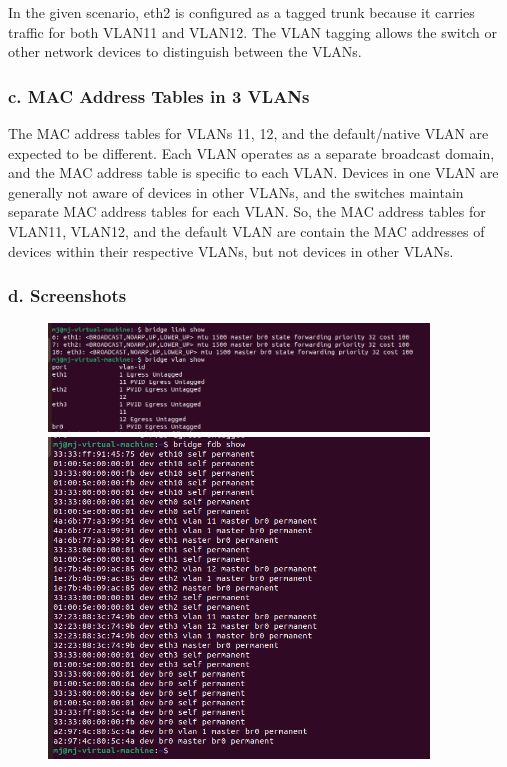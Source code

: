 \documentclass{report}
\begin{document}
In the given scenario, eth2 is configured as a tagged trunk because it carries traffic for both VLAN11 and VLAN12.
The VLAN tagging allows the switch or other network devices to distinguish between the VLANs.

\subsubsection*{c. MAC Address Tables in 3 VLANs}
The MAC address tables for VLANs 11, 12, and the default/native VLAN are expected to be different. 
Each VLAN operates as a separate broadcast domain, and the MAC address table is specific to each VLAN.
Devices in one VLAN are generally not aware of devices in other VLANs, and the switches maintain separate MAC address tables for each VLAN.
So, the MAC address tables for VLAN11, VLAN12, and the default VLAN are contain the MAC addresses of devices within their respective VLANs, but not devices in other VLANs.

\subsubsection*{d. Screenshots}
\begin{figure}[h] 
  \centering 
  \includegraphics[width=0.9\textwidth]{31.png} 
  \centering 
  \includegraphics[width=0.9\textwidth]{32.png} 
\end{figure} 
\end{document}
